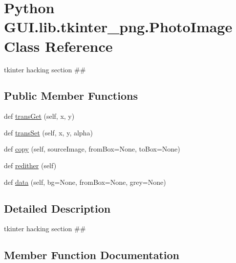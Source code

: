 \hypertarget{class_python_01_g_u_i_1_1lib_1_1tkinter__png_1_1_photo_image}{}\section{Python G\+U\+I.\+lib.\+tkinter\+\_\+png.\+Photo\+Image Class Reference}
\label{class_python_01_g_u_i_1_1lib_1_1tkinter__png_1_1_photo_image}


tkinter hacking section \#\#  


\subsection*{Public Member Functions}
\begin{DoxyCompactItemize}
\item 
def \hyperlink{class_python_01_g_u_i_1_1lib_1_1tkinter__png_1_1_photo_image_aae7b7df768ddbee6361a580e6a442743}{trans\+Get} (self, x, y)
\item 
def \hyperlink{class_python_01_g_u_i_1_1lib_1_1tkinter__png_1_1_photo_image_a05986ba56b25e3c6a552cbf4d27f98f5}{trans\+Set} (self, x, y, alpha)
\item 
def \hyperlink{class_python_01_g_u_i_1_1lib_1_1tkinter__png_1_1_photo_image_a0eadfd7faea080000d9132625fb702ad}{copy} (self, source\+Image, from\+Box=None, to\+Box=None)
\item 
def \hyperlink{class_python_01_g_u_i_1_1lib_1_1tkinter__png_1_1_photo_image_a339c767de9d64721537c33d7e56f7779}{redither} (self)
\item 
def \hyperlink{class_python_01_g_u_i_1_1lib_1_1tkinter__png_1_1_photo_image_a9dc5998b9c861f2e04f5e4cf4c7c7c84}{data} (self, bg=None, from\+Box=None, grey=None)
\end{DoxyCompactItemize}


\subsection{Detailed Description}
tkinter hacking section \#\# 

\subsection{Member Function Documentation}
\mbox{\label{class_python_01_g_u_i_1_1lib_1_1tkinter__png_1_1_photo_image_a0eadfd7faea080000d9132625fb702ad}} 

